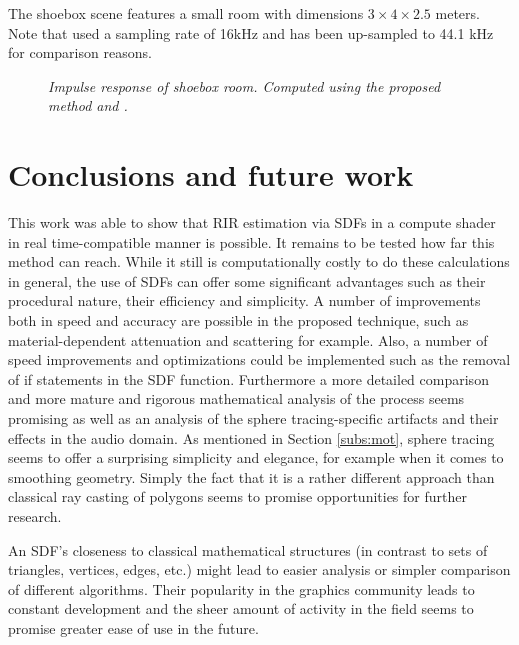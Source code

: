 \documentclass[twoside,a4paper]{article}
\begin{document}
The shoebox scene features a small room with dimensions $3 \times 4 \times 2.5$ meters. Note that \cite{lehmann_fast_2020} used a sampling rate of 16kHz and has been up-sampled to 44.1 kHz for comparison reasons. 

\begin{figure}
    \begin{center}
      
    \end{center}
    \caption{\label{fig:shoe} \it Impulse response of shoebox room. Computed using the proposed method and \cite{lehmann_fast_2020}. }
    
\end{figure}

\section{Conclusions and future work}
\label{sec:concl}

This work was able to show that RIR estimation via SDFs in a compute shader in real time-compatible manner is possible. It remains to be tested how far this method can reach. While it still is computationally costly to do these calculations in general, the use of SDFs can offer some significant advantages such as their procedural nature, their efficiency and simplicity. A number of improvements both in speed and accuracy are possible in the proposed technique, such as material-dependent attenuation and scattering for example. Also, a number of speed improvements and optimizations could be implemented such as the removal of if statements in the SDF function. Furthermore a more detailed comparison and more mature and rigorous mathematical analysis of the process seems promising as well as an analysis of the sphere tracing-specific artifacts and their effects in the audio domain. As mentioned in Section \ref{subs:mot}, sphere tracing seems to offer a surprising simplicity and elegance, for example when it comes to smoothing geometry. Simply the fact that it is a rather different approach than classical ray casting of polygons seems to promise opportunities for further research. 

An SDF's closeness to classical mathematical structures (in contrast to sets of triangles, vertices, edges, etc.) might lead to easier analysis or simpler comparison of different algorithms. Their popularity in the graphics community leads to constant development and the sheer amount of activity in the field seems to promise greater ease of use in the future. \
\end{document}
